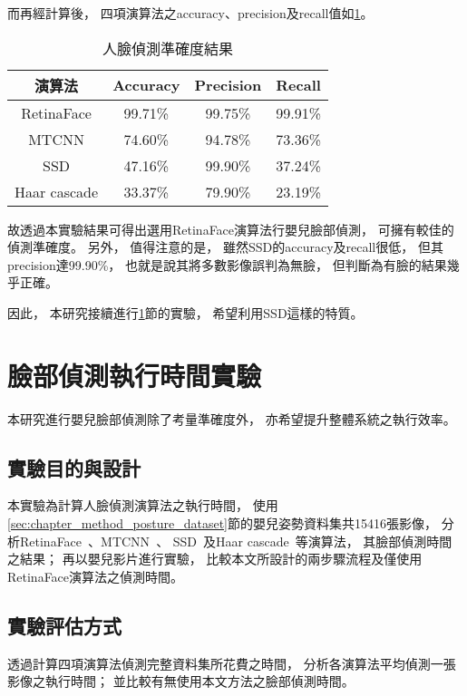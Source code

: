 \documentclass[class=NCU_thesis, crop=false]{standalone}
\begin{document}
而再經計算後，
四項演算法之accuracy、precision及recall值如\cref{table:table-face-detection-accuracy}。

\begin{table}[h]
    \centering
    \caption{人臉偵測準確度結果}
    \label{table:table-face-detection-accuracy}
    \begin{tabular}{cccc}
    \hline
    演算法 & Accuracy & Precision & Recall \\
    \hline
    RetinaFace & 99.71\% & 99.75\% & 99.91\% \\
    MTCNN & 74.60\% & 94.78\% & 73.36\% \\
    SSD & 47.16\% & 99.90\% & 37.24\% \\
    Haar cascade & 33.37\% & 79.90\% & 23.19\% \\
    \hline
    \end{tabular}
\end{table}

故透過本實驗結果可得出選用RetinaFace演算法行嬰兒臉部偵測，
可擁有較佳的偵測準確度。
另外，
值得注意的是，
雖然SSD的accuracy及recall很低，
但其precision達99.90\%，
也就是說其將多數影像誤判為無臉，
但判斷為有臉的結果幾乎正確。

因此，
本研究接續進行\ref{sec:chapter_experiment_face_time}節的實驗，
希望利用SSD這樣的特質。

\section{臉部偵測執行時間實驗}
\label{sec:chapter_experiment_face_time}
本研究進行嬰兒臉部偵測除了考量準確度外，
亦希望提升整體系統之執行效率。

\subsection{實驗目的與設計}
本實驗為計算人臉偵測演算法之執行時間，
使用\ref{sec:chapter_method_posture_dataset}節的嬰兒姿勢資料集共15416張影像，
分析RetinaFace~\cite{deng_retinaface_2020}、MTCNN~\cite{zhang_joint_2016}、
SSD~\cite{ye_face_2021}及Haar cascade~\cite{goyal_face_2017}等演算法，
其臉部偵測時間之結果；
再以嬰兒影片進行實驗，
比較本文所設計的兩步驟流程及僅使用RetinaFace演算法之偵測時間。

\subsection{實驗評估方式}
透過計算四項演算法偵測完整資料集所花費之時間，
分析各演算法平均偵測一張影像之執行時間；
並比較有無使用本文方法之臉部偵測時間。
\end{document}

